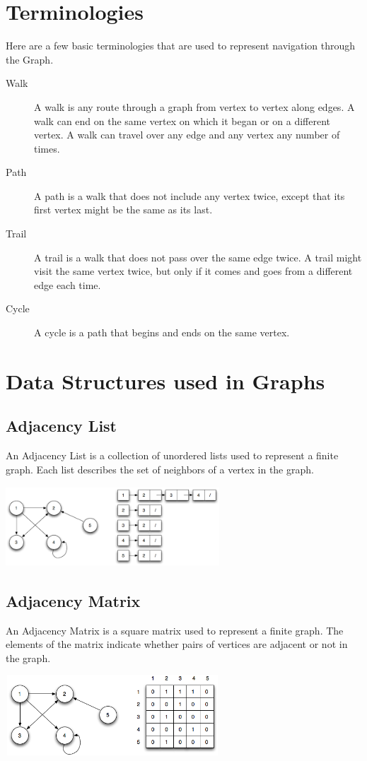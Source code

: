 \documentclass[11pt,a4paper]{extarticle}
\begin{document}
\section{Terminologies}
Here are a few basic terminologies that are used to represent navigation through the Graph. \\
\begin{adjustwidth}{1.5em}{0pt}
\begin{description}
\item [Walk] A walk is any route through a graph from vertex to vertex along edges. A walk can end on the same vertex on which it began or on a different vertex. A walk can travel over any edge and any vertex any number of times.
\item [Path] A path is a walk that does not include any vertex twice, except that its first vertex might be the same as its last.
\item [Trail] A trail is a walk that does not pass over the same edge twice. A trail might visit the same vertex twice, but only if it comes and goes from a different edge each time.
\item [Cycle] A cycle is a path that begins and ends on the same vertex.	
\end{description}
\end{adjustwidth}

\section{Data Structures used in Graphs}
\subsection{Adjacency List}
An Adjacency List is a collection of unordered lists used to represent a finite graph. Each list describes the set of neighbors of a vertex in the graph.
\begin{center}
	\includegraphics[width=8cm, height=3cm]{list}
\end{center} 

\subsection{Adjacency Matrix}
An Adjacency Matrix is a square matrix used to represent a finite graph. The elements of the matrix indicate whether pairs of vertices are adjacent or not in the graph.
\begin{center}
	\includegraphics[width=8cm, height=3cm]{matrix}
\end{center}
 
\end{document}
